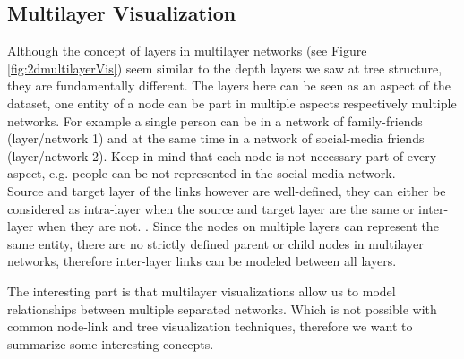 \subsection{Multilayer Visualization}

Although the concept of layers in multilayer networks (see Figure \ref{fig:2dmultilayerVis}) seem similar to the depth layers we saw at tree structure, they are fundamentally different. The layers here can be seen as an aspect of the dataset, one entity of a node can be part in multiple aspects respectively multiple networks. For example a single person can be in a network of family-friends (layer/network 1) and at the same time in a network of social-media friends (layer/network 2). Keep in mind that each node is not necessary part of every aspect, e.g. people can be not represented in the social-media network.\\
Source and target layer of the links however are well-defined, they can either be considered as intra-layer when the source and target layer are the same or inter-layer when they are not. \cite{ghoniem_state_2019}. Since the nodes on multiple layers can represent the same entity, there are no strictly defined parent or child nodes in multilayer networks, therefore inter-layer links can be modeled between all layers.

The interesting part is that multilayer visualizations allow us to model relationships between multiple separated networks. Which is not possible with common node-link and tree visualization techniques, therefore we want to summarize some interesting concepts.



